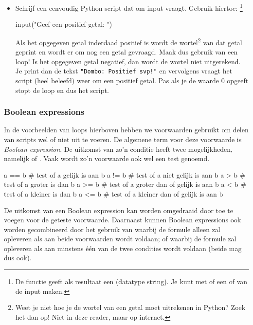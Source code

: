 \documentclass[a4paper,11pt, fleqn]{article}
\begin{document}
\begin{itemize}
\item Schrijf een eenvoudig Python-script dat om input vraagt. Gebruik hiertoe: \footnote{De functie  geeft als resultaat een  (datatype string). Je kunt met  of  een  of  van de input maken.}
\begin{python}
input("Geef een positief getal: ")
\end{python}
Als het opgegeven getal inderdaad positief is wordt de wortel\footnote{Weet je niet hoe je de wortel van een getal moet uitrekenen in Python? Zoek het dan op! Niet in deze reader, maar op internet.} van dat getal geprint en wordt er om nog een getal gevraagd. Maak dus gebruik van een loop!
Is het opgegeven getal negatief, dan wordt de wortel niet uitgerekend. Je print dan de tekst \verb."Dombo: Positief svp!". en vervolgens vraagt het script (heel beleefd) weer om een positief getal. Pas als je de waarde 0 opgeeft stopt de loop en dus het script.
\end{itemize}

\subsubsection{Boolean expressions}
In de voorbeelden van loops hierboven hebben we voorwaarden gebruikt om delen van scripts wel of niet uit te voeren. De algemene term voor deze voorwaarde is \textit{Boolean expression}. De uitkomst van zo'n conditie heeft twee mogelijkheden, namelijk  of . Vaak wordt zo'n voorwaarde ook wel een test genoemd.

\begin{python}
a == b	# test of a gelijk is aan b
a != b	# test of a niet gelijk is aan b
a > b	# test of a groter is dan b
a >= b	# test of a groter dan of gelijk is aan b
a < b	# test of a kleiner is dan b
a <= b	# test of a kleiner dan of gelijk is aan b
\end{python}

De uitkomst van een Boolean expression kan worden omgedraaid door  toe te voegen voor de geteste voorwaarde. Daarnaast kunnen Boolean expressions ook worden gecombineerd door het gebruik van  waarbij de formule alleen   zal opleveren als aan beide voorwaarden wordt voldaan; of  waarbij de formule  zal opleveren als aan minstens \'e\'en van de twee condities wordt voldaan (beide mag dus ook).
\end{document}
